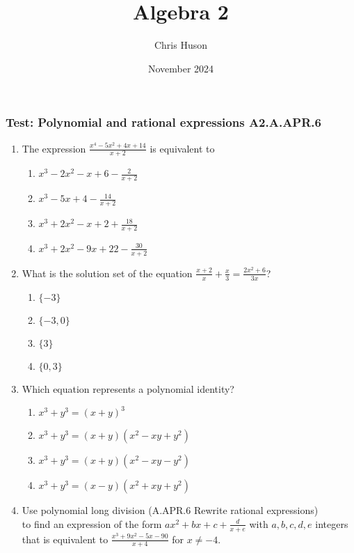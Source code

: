 \documentclass[12pt, twoside]{article}
\title{Algebra 2}
\author{Chris Huson}
\date{November 2024}
\begin{document}
\subsubsection*{Test: Polynomial and rational  expressions \hfill A2.A.APR.6}
\begin{enumerate}[itemsep=0.5cm]

\item The expression $\displaystyle \frac{x^4 - 5x^2 + 4x + 14}{x+2}$ is equivalent to
    \begin{enumerate}
        \item $\displaystyle x^3 - 2x^2 - x + 6 - \frac{2}{x + 2}$
        \item $\displaystyle x^3 - 5x + 4 - \frac{14}{x + 2}$
        \item $\displaystyle x^3 + 2x^2 - x + 2 + \frac{18}{x + 2}$
        \item $\displaystyle x^3 + 2x^2 - 9x + 22 - \frac{30}{x + 2}$
    \end{enumerate} \vspace{3cm}
    
\item What is the solution set of the equation \(\displaystyle \frac{x+2}{x} + \frac{x}{3} = \frac{2x^2+6}{3x}\)?
    \begin{enumerate}
        \item \(\{-3\}\)
        \item \(\{-3, 0\}\)
        \item \(\{3\}\)
        \item \(\{0, 3\}\)
    \end{enumerate} \vspace{3cm}
    
\item Which equation represents a polynomial identity? %
    \begin{enumerate}
        \item \(x^3 + y^3 = (x + y)^3\)
        \item \(x^3 + y^3 = (x + y)(x^2 - xy + y^2)\)
        \item \(x^3 + y^3 = (x + y)(x^2 - xy - y^2)\)
        \item \(x^3 + y^3 = (x - y)(x^2 + xy + y^2)\)
    \end{enumerate}
    
\newpage 
\item Use polynomial long division \hfill (A.APR.6 Rewrite rational expressions) \\[0.5cm] 
to find an expression of the form $ax^2 + bx +c +\frac{d}{x+e}$ with $a,b,c,d,e$ integers that is equivalent to $\displaystyle \frac{x^3 + 9x^2 - 5x - 90}{x + 4}
$ for $x \neq -4$.
\vspace{10cm}


\end{enumerate}
\end{document}
